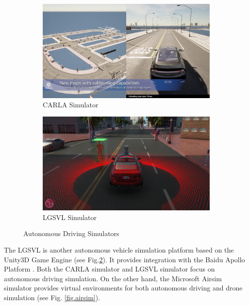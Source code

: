 \begin{figure}[H]
\centering
\begin{subfigure}[b]{0.48\textwidth}
    \centering
    \includegraphics[width=\textwidth]{figures/chapter_intro/carla.jpg}
    \caption{CARLA Simulator \citep{Dosovitskiy17}}
    \label{fig:carla_intro}
\end{subfigure}
\hfill
\begin{subfigure}[b]{0.48\textwidth}
    \centering
    \includegraphics[width=\textwidth]{figures/chapter_intro/lgsvl.png}
    \caption{LGSVL Simulator\citep{rong2020lgsvl}}
    \label{fig:lvsvl}
\end{subfigure}
\hfill
\caption{Autonomous Driving Simulators}
\label{fig.simulator}
\end{figure}

The LGSVL is another autonomous vehicle simulation platform based on the Unity3D Game Engine (see Fig.\ref{fig:lvsvl}). It provides integration with the Baidu Apollo Platform \citep{rong2020lgsvl}. Both the CARLA simulator and LGSVL simulator focus on autonomous driving simulation. On the other hand, the Microsoft Airsim simulator provides virtual environments for both autonomous driving and drone simulation \citep{airsim2017fsr} (see Fig. \ref{fig.airsim}).

